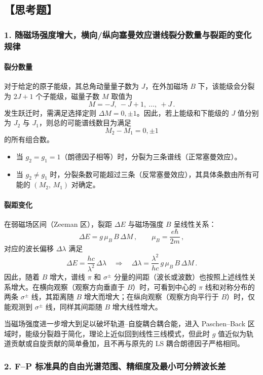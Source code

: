 \documentclass[12pt,a4paper,UTF8]{ctexart}
\begin{document}
\subsection*{【思考题】}

\subsubsection*{1. 随磁场强度增大，横向/纵向塞曼效应谱线裂分数量与裂距的变化规律}

\paragraph{裂分数量}  
对于给定的原子能级，其总角动量量子数为 $J$，在外加磁场 $B$ 下，该能级会分裂为 $2J+1$ 个子能级，磁量子数 $M$ 取值为
\[
M = -J,\ -J+1,\ \dots,\ +J\,.
\]
发生跃迁时，需满足选择定则 $\Delta M = 0, \pm 1$。因此，若上能级和下能级的 $J$ 值分别为 $J_2$ 与 $J_1$，则总的可能谱线数目为满足
\[
M_2 - M_1 = 0, \pm 1
\]
的所有组合数。  
\begin{itemize}
  \item 当 $g_2 = g_1 = 1$（朗德因子相等）时，分裂为三条谱线（正常塞曼效应）。  
  \item 当 $g_2 \neq g_1$ 时，分裂条数可能超过三条（反常塞曼效应），其具体条数由所有可能的 $(M_2,\,M_1)$ 对确定。  
\end{itemize}
\paragraph{裂距变化}  
在弱磁场区间（Zeeman 区），裂距 $\Delta E$ 与磁场强度 $B$ 呈线性关系：
\[
\Delta E = g\,\mu_B\,B\,\Delta M \,,
\qquad \mu_B = \frac{e\hbar}{2m}\,,
\]
对应的波长偏移 $\Delta \lambda$ 满足
\[
\Delta E = \frac{hc}{\lambda^2}\,\Delta \lambda \quad\Longrightarrow\quad \Delta \lambda = \frac{\lambda^2}{hc}\,g\,\mu_B\,B\,\Delta M \,.
\]
因此，随着 $B$ 增大，谱线 $\pi$ 和 $\sigma^\pm$ 分量的间距（波长或波数）也按照上述线性关系增大。在横向观察（观察方向垂直于 $B$）时，可看到中心的 $\pi$ 线和对称分布的两条 $\sigma^\pm$ 线，其距离随 $B$ 增大而增大；在纵向观察（观察方向平行于 $B$）时，仅能观测到 $\sigma^\pm$ 线，同样其间距随 $B$ 增大线性增大。  

当磁场强度进一步增大到足以破坏轨道–自旋耦合耦合能，进入 Paschen–Back 区域时，能级分裂趋于简化，理论上近似回到线性三线模式，但此时 $g$ 值近似为轨道贡献或自旋贡献的简单叠加，且不再与原先的 LS 耦合朗德因子严格相同。

\subsubsection*{2. F–P 标准具的自由光谱范围、精细度及最小可分辨波长差}
\end{document}
